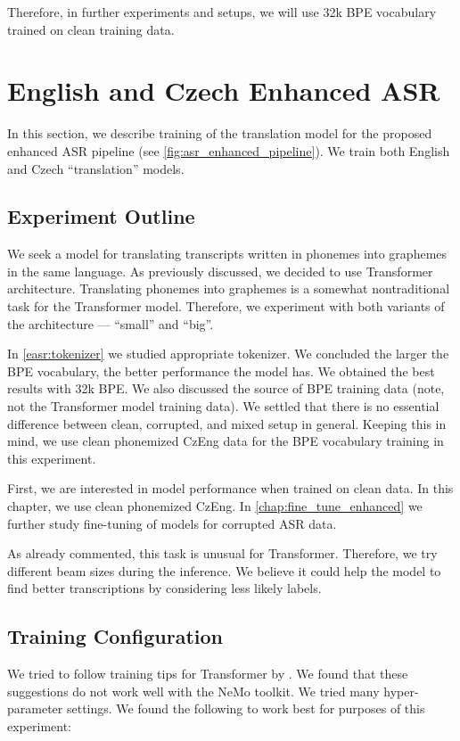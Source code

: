 Therefore, in further experiments and setups, we will use 32k BPE vocabulary trained on clean training data.









\section{English and Czech Enhanced ASR}
\label{easr:english}
In this section, we describe training of the translation model for the proposed enhanced ASR pipeline (see \cref{fig:asr_enhanced_pipeline}). We train both English and Czech ``translation'' models.

\subsection{Experiment Outline}
\label{easr:outline}
We seek a model for translating transcripts written in phonemes into graphemes in the same language. As previously discussed, we decided to use Transformer architecture. Translating phonemes into graphemes is a somewhat nontraditional task for the Transformer model. Therefore, we experiment with both variants of the architecture --- ``small'' and ``big''. 

In \cref{easr:tokenizer} we studied appropriate tokenizer. We concluded the larger the BPE vocabulary, the better performance the model has. We obtained the best results with 32k BPE. We also discussed the source of BPE training data (note, not the Transformer model training data). We settled that there is no essential difference between clean, corrupted, and mixed setup in general. Keeping this in mind, we use clean phonemized CzEng data for the BPE vocabulary training in this experiment. 

First, we are interested in model performance when trained on clean data. In this chapter, we use clean phonemized CzEng. In \cref{chap:fine_tune_enhanced} we further study fine-tuning of models for corrupted ASR data.

As already commented, this task is unusual for Transformer. Therefore, we try different beam sizes during the inference. We believe it could help the model to find better transcriptions by considering less likely labels.

\subsection{Training Configuration}
\label{easr:training}
We tried to follow training tips for Transformer by . We found that these suggestions do not work well with the NeMo toolkit. We tried many hyper-parameter settings. We found the following to work best for purposes of this experiment:

